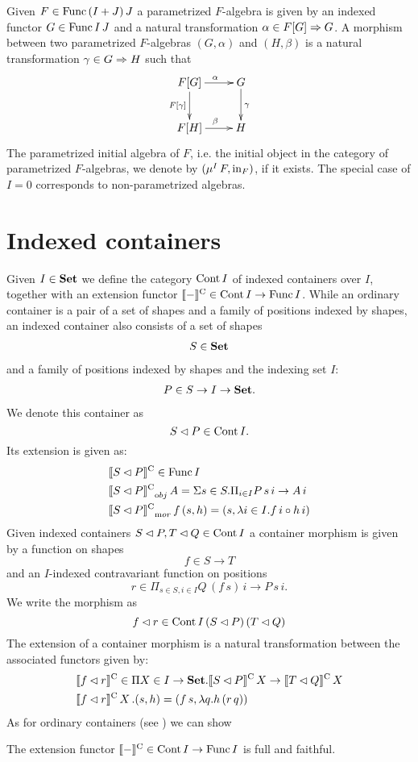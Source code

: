\documentclass[10pt, conference, compsocconf]{IEEEtran}
\begin{document}
Given $F\in \mathrm{Func}\,(I+J)\,J$ a parametrized $F$-algebra is given by 
an indexed functor $G\in\mathrm{Func}\,I\,J$ and a natural transformation
$\alpha \in F[G] \Rightarrow G$. A morphism between two parametrized
$F$-algebras $(G,\alpha)$ and $(H,\beta)$ is a natural
transformation $\gamma \in G \Rightarrow H$ such that 
\[
\xymatrix{
F[G]  \ar[r]^{\alpha} 
\ar[d]_{F[\gamma]} & G \ar[d]^{\gamma}\\
F[H] \ar[r]^{\beta} & H}
\]
The parametrized initial algebra of $F$, i.e. the initial object in
the category of parametrized $F$-algebras, we denote by
$(\mu^I\,F,\mathrm{in}_F)$, if it exists. The special case of $I=0$
corresponds to non-parametrized algebras.

\section{Indexed containers}
\label{sec:indexed-container}

\noindent Given $I\in\mathbf{Set}$ we define the category $\mathrm{Cont}\,I$ of indexed
containers over $I$, together with an extension functor $\llbracket-\rrbracket^{\mathrm C}\in
\mathrm{Cont}\,I\to\mathrm{Func}\,I$. While an ordinary container is a pair of a set
of shapes and a family of positions indexed by shapes, an indexed
container also consists of a set of shapes
\begin{gather*}
  S \in \mathbf{Set}
\end{gather*}
and a family of positions indexed by shapes and the indexing set $I$:
\begin{gather*}
  P\in S\to I \to\mathbf{Set}.
\end{gather*}
We denote this container as
\[S \lhd P\in\mathrm{Cont}\,I.\] 
Its extension is given as:
\begin{align*}
& \llbracket S \lhd P\rrbracket^{\mathrm C} \in \mathrm{Func}\,I\\  
& {\llbracket S \lhd P\rrbracket^{\mathrm C}}_{\mathrm obj}\,A = \Sigma s\in
  S.\Pi_{i\in I}P\,s\,i \to A\,i\\
& {\llbracket S \lhd P\rrbracket^{\mathrm C}}_{\mathrm mor}\,f\,(s,h) = (s,\lambda i\in I.f\,i \circ h\,i)  
\end{align*}
Given indexed containers
$S \lhd P,T \lhd Q\in \mathrm{Cont}\,I$ a container morphism is given by
a function on shapes 
\[ f\in S\to T \] 
and an $I$-indexed contravariant
function on positions 
\[r\in\Pi_{s\in S,i\in I}Q\,(f\,s)\,i\to P\,s\,i.\] 
We write the morphism as 
\[f \lhd r\in \mathrm{Cont}\,I\,(S \lhd P)\,(T \lhd Q) \]
The extension of a container morphism is a
natural transformation between the associated functors given by:
\begin{align*}
& \llbracket f \lhd r\rrbracket^{\mathrm C} \in
  \Pi X\in I\to\mathbf{Set}.\llbracket S \lhd P\rrbracket^{\mathrm C}\,X \to \llbracket T \lhd Q\rrbracket^{\mathrm C}\,X\\
& \llbracket f \lhd r\rrbracket^{\mathrm C}\,X\,.(s,h) = (f\,s,\lambda q.h\,(r\,q))
\end{align*}
As for ordinary containers (see \cite{alti:cont-tcs}) we can show 
\begin{proposition}\label{prop:extfull}
  The extension functor $\llbracket-\rrbracket^{\mathrm C}\in\mathrm{Cont}\,I\to\mathrm{Func}\,I$ is full and faithful.
\end{proposition}
\end{document}
